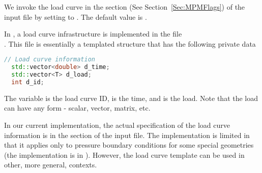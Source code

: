 We invoke the load curve in the  section
(See Section~\ref{Sec:MPMFlags}) of the input file
by setting  to .  The default value
is .

In \Vaango, a load curve infrastructure is implemented in the file \\
.  This file is essentially a templated
structure that has the following private data
\begin{lstlisting}[language=Cpp]
  // Load curve information 
  std::vector<double> d_time;
  std::vector<T> d_load;
  int d_id;
\end{lstlisting}
The variable  is the load curve ID,  is the time,
and  is the load.  Note that the load can have any form - scalar,
vector, matrix, etc.

In our current implementation, the actual specification of the load curve
information is in the  section of the input file.  The
implementation is limited in that it applies only to pressure boundary
conditions for some special geometries (the implementation is in
).  However, the load curve template can
be used in other, more general, contexts.

